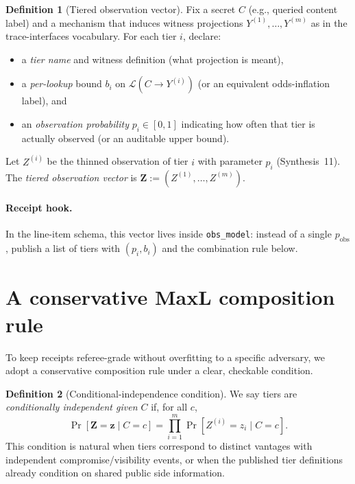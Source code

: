 \documentclass[11pt]{article}
\theoremstyle{definition}
\newtheorem{definition}{Definition}
\newcommand{\MaxL}{\mathcal{L}}
\begin{document}
\begin{definition}[Tiered observation vector]
Fix a secret $C$ (e.g., queried content label) and a mechanism that induces witness projections $Y^{(1)},\dots,Y^{(m)}$ as in the trace-interfaces vocabulary.\cite{series:traceifaces}
For each tier $i$, declare:
\begin{itemize}[leftmargin=1.2em]
\item a \emph{tier name} and witness definition (what projection is meant),
\item a \emph{per-lookup} bound $b_i$ on $\MaxL(C\to Y^{(i)})$ (or an equivalent odds-inflation label), and
\item an \emph{observation probability} $p_i\in[0,1]$ indicating how often that tier is actually observed (or an auditable upper bound).
\end{itemize}
Let $Z^{(i)}$ be the thinned observation of tier $i$ with parameter $p_i$ (Synthesis~11).\cite{series:obsatten}
The \emph{tiered observation vector} is $\mathbf{Z} := (Z^{(1)},\dots,Z^{(m)})$.
\end{definition}

\paragraph{Receipt hook.}
In the line-item schema, this vector lives inside \texttt{obs\_model}: instead of a single $p_{\mathrm{obs}}$, publish a list of tiers with $(p_i, b_i)$ and the combination rule below.\cite{series:receiptitems}

\section{A conservative MaxL composition rule}
To keep receipts referee-grade without overfitting to a specific adversary, we adopt a conservative composition rule under a clear, checkable condition.

\begin{definition}[Conditional-independence condition]
We say tiers are \emph{conditionally independent given $C$} if, for all $c$,
\[\Pr[\mathbf{Z}=\mathbf{z}\mid C=c] = \prod_{i=1}^m \Pr[Z^{(i)}=z_i\mid C=c].\]
This condition is natural when tiers correspond to distinct vantages with independent compromise/visibility events, or when the published tier definitions already condition on shared public side information.
\end{definition}
\end{document}
